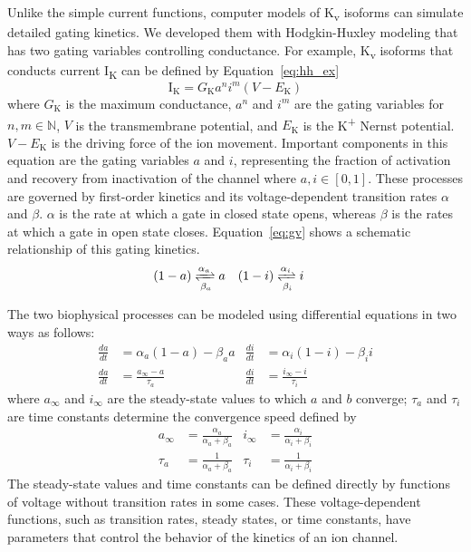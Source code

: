 \documentclass[11pt]{article}
\begin{document}
Unlike the simple current functions, computer models of K\textsubscript{v} isoforms can simulate detailed gating kinetics. We developed them with Hodgkin-Huxley modeling that has two gating variables controlling conductance. For example, K\textsubscript{v} isoforms that conducts current I\textsubscript{K} can be defined by Equation~\ref{eq:hh_ex}
\begin{equation}
    \label{eq:hh_ex}
    \mathrm{I}_{\mathrm{K}} = G_{\mathrm{K}}a^{n}i^{m}(V-E_{\mathrm{K}})
\end{equation}
where $G_{\mathrm{K}}$ is the maximum conductance, $a^{n}$ and $i^{m}$ are the gating variables for $n,m \in \mathbb{N}$, $V$ is the transmembrane potential, and $E_{\mathrm{K}}$ is the K\textsuperscript{+} Nernst potential. $V-E_{\mathrm{K}}$ is the driving force of the ion movement. Important components in this equation are the gating variables $a$ and $i$, representing the fraction of activation and recovery from inactivation of the channel where $a,i \in [0,1]$. These processes are governed by first-order kinetics and its voltage-dependent transition rates $\alpha$ and $\beta$. $\alpha$ is the rate at which a gate in closed state opens, whereas $\beta$ is the rates at which a gate in open state closes. Equation~\ref{eq:gv} shows a schematic relationship of this gating kinetics.
\begin{align}
    \label{eq:gv}
    (1-a)&\xrightleftharpoons[\beta_{a}]{\alpha_{a}}a & (1-i)&\xrightleftharpoons[\beta_{i}]{\alpha_{i}}i
\end{align}

The two biophysical processes can be modeled using differential equations in two ways as follows:
\begin{align}
    \frac{da}{dt} &=\alpha_{a}(1-a)-\beta_{a}a   &\frac{di}{dt} &=\alpha_{i}(1-i)-\beta_{i}i \\
    \frac{da}{dt} &= \frac{a_{\infty}-a}{\tau_{a}}  &\frac{di}{dt} &= \frac{i_{\infty}-i}{\tau_{i}}
\end{align}
where $a_{\infty}$ and $i_{\infty}$ are the steady-state values to which $a$ and $b$ converge; $\tau_{a}$ and $\tau_{i}$ are time constants determine the convergence speed defined by
\begin{align}
    a_{\infty} &= \frac{\alpha_{a}}{\alpha_{a}+\beta_{a}} & i_{\infty} &=  \frac{\alpha_{i}}{\alpha_{i}+\beta_{i}} \\
    \tau_{a} &= \frac{1}{\alpha_{a}+\beta_{a}} & \tau_{i} &= \frac{1}{\alpha_{i}+\beta_{i}}
\end{align}
The steady-state values and time constants can be defined directly by functions of voltage without transition rates in some cases. These voltage-dependent functions, such as transition rates, steady states, or time constants, have parameters that control the behavior of the kinetics of an ion channel.
\end{document}
